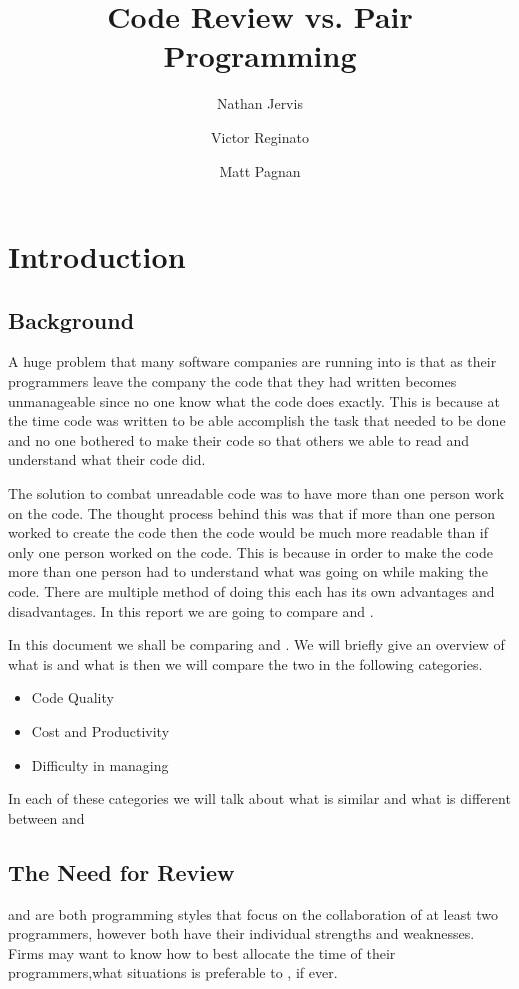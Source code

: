 \documentclass{article}
\title{Code Review vs. Pair Programming}
\author{Nathan Jervis \and Victor Reginato \and Matt Pagnan}
\begin{document}
\maketitle

\tableofcontents

\section{Introduction}

\subsection{Background}
A huge problem that many software companies are running into is that as their programmers leave the company the code that they had written becomes unmanageable since no one know what the code does exactly. This is because at the time code was written to be able accomplish the task that needed to be done and no one bothered to make their code so that others we able to read and understand what their code did.

The solution to combat unreadable code was to have more than one person work on the code. The thought process behind this was that if more than one person worked to create the code then the code would be much more readable than if only one person worked on the code. This is because in order to make the code more than one person had to understand what was going on while making the code. There are multiple method of doing this each has its own advantages and disadvantages. In this report we are going to compare \PP and \CR.

In this document we shall be comparing \PP and \CR. We will briefly give an overview of what \PP is and what \CR is then we will compare the two in the following categories.
\begin{itemize}
\item Code Quality
\item Cost and Productivity
\item Difficulty in managing
\end{itemize}

In each of these categories we will talk about what is similar and what is different between \PP and \CR

\subsection{The Need for Review}
\PP and \CR are both programming styles that focus on the collaboration of at least two programmers, however both have their individual strengths and weaknesses. Firms may want to know how to best allocate the time of their programmers,what situations \PP is preferable to \CR, if ever. 
\end{document}
